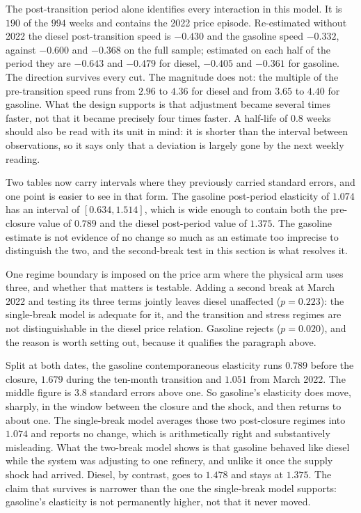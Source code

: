 \documentclass[11pt,a4paper]{article}
\begin{document}
The post-transition period alone identifies every interaction in this model. It is $190$ of the
$994$ weeks and contains the 2022 price episode. Re-estimated without 2022 the diesel post-transition
speed is $-0.430$ and the gasoline speed $-0.332$, against $-0.600$ and $-0.368$ on
the full sample; estimated on each half of the period they are $-0.643$ and $-0.479$ for diesel,
$-0.405$ and $-0.361$ for gasoline. The direction survives every cut. The magnitude does not:
the multiple of the pre-transition speed runs from $2.96$ to $4.36$ for diesel and from $3.65$
to $4.40$ for gasoline. What the design supports is that adjustment became several times faster,
not that it became precisely four times faster. A half-life of $0.8$ weeks should also be read
with its unit in mind: it is shorter than the interval between observations, so it says only
that a deviation is largely gone by the next weekly reading.

Two tables now carry intervals where they previously carried standard errors, and one point is
easier to see in that form. The gasoline post-period elasticity of $1.074$ has an interval of
$[0.634, 1.514]$, which is wide enough to contain both the pre-closure value of $0.789$ and the
diesel post-period value of $1.375$. The gasoline estimate is not evidence of no change so much
as an estimate too imprecise to distinguish the two, and the second-break test in this section
is what resolves it.

One regime boundary is imposed on the price arm where the physical arm uses three, and whether
that matters is testable. Adding a second break at March 2022 and testing its three terms
jointly leaves diesel unaffected ($p=0.223$): the single-break model is adequate for it, and the
transition and stress regimes are not distinguishable in the diesel price relation. Gasoline
rejects ($p=0.020$), and the reason is worth setting out, because it qualifies the paragraph
above.

Split at both dates, the gasoline contemporaneous elasticity runs $0.789$ before the closure,
$1.679$ during the ten-month transition and $1.051$ from March 2022. The middle figure is $3.8$
standard errors above one. So gasoline's elasticity does move, sharply, in the window between
the closure and the shock, and then returns to about one. The single-break model averages those
two post-closure regimes into $1.074$ and reports no change, which is arithmetically right and
substantively misleading. What the two-break model shows is that gasoline behaved like diesel
while the system was adjusting to one refinery, and unlike it once the supply shock had arrived.
Diesel, by contrast, goes to $1.478$ and stays at $1.375$. The claim that survives is narrower
than the one the single-break model supports: gasoline's elasticity is not permanently higher,
not that it never moved.
\end{document}
